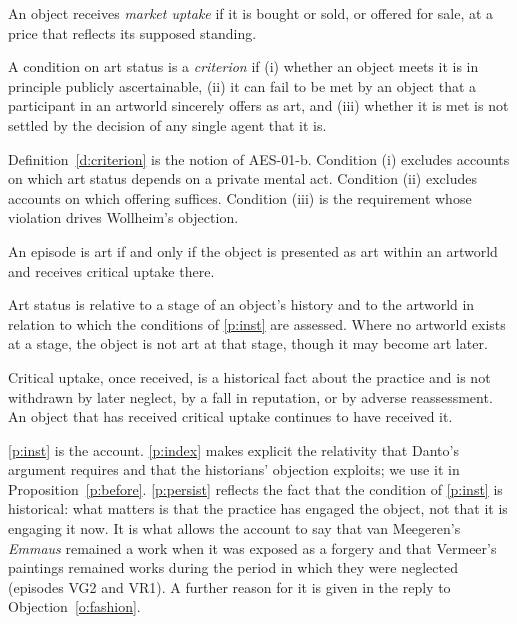 \documentclass{situationist-preprint}
\begin{document}
\begin{definition}\label{d:market}
An object receives \emph{market uptake} if it is bought or sold, or offered for sale, at a price that reflects its supposed standing.
\end{definition}

\begin{definition}[Criterion]\label{d:criterion}
A condition on art status is a \emph{criterion} if (i) whether an object meets it is in principle publicly ascertainable, (ii) it can fail to be met by an object that a participant in an artworld sincerely offers as art, and (iii) whether it is met is not settled by the decision of any single agent that it is.
\end{definition}

Definition~\ref{d:criterion} is the notion of AES-01-b. Condition (i) excludes accounts on which art status depends on a private mental act. Condition (ii) excludes accounts on which offering suffices. Condition (iii) is the requirement whose violation drives Wollheim's objection.

\begin{principle}\label{p:inst}
An episode is art if and only if the object is presented as art within an artworld and receives critical uptake there.
\end{principle}

\begin{principle}[Indexing]\label{p:index}
Art status is relative to a stage of an object's history and to the artworld in relation to which the conditions of \ref{p:inst} are assessed. Where no artworld exists at a stage, the object is not art at that stage, though it may become art later.
\end{principle}

\begin{principle}[Persistence]\label{p:persist}
Critical uptake, once received, is a historical fact about the practice and is not withdrawn by later neglect, by a fall in reputation, or by adverse reassessment. An object that has received critical uptake continues to have received it.
\end{principle}

\ref{p:inst} is the account. \ref{p:index} makes explicit the relativity that Danto's argument requires and that the historians' objection exploits; we use it in Proposition~\ref{p:before}. \ref{p:persist} reflects the fact that the condition of \ref{p:inst} is historical: what matters is that the practice has engaged the object, not that it is engaging it now. It is what allows the account to say that van Meegeren's \emph{Emmaus} remained a work when it was exposed as a forgery and that Vermeer's paintings remained works during the period in which they were neglected (episodes VG2 and VR1). A further reason for it is given in the reply to Objection~\ref{o:fashion}.
\end{document}
